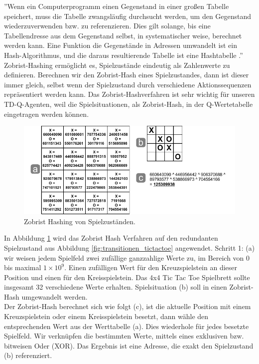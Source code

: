 ''Wenn ein Computerprogramm einen Gegenstand in einer großen Tabelle speichert, muss die Tabelle zwangsläufig durchsucht werden, um den Gegenstand wiederzuverwenden bzw. zu referenzieren. Dies gilt solange, bis eine Tabellendresse aus dem Gegenstand selbst, in systematischer weise, berechnet werden kann. Eine Funktion die Gegenstände in Adressen umwandelt ist ein Hash-Algorithmus, und die daraus resultierende Tabelle ist eine Hashtabelle \cite[3]{Zobrist}.'' \\

Zobrist-Hashing ermöglicht es, Spielzustände eindeutig als Zahlenwerte zu definieren. Berechnen wir den Zobrist-Hash eines Spielzustandes, dann ist dieser immer gleich, selbst wenn der Spielzustand durch verschiedene Aktionssequenzen repräsentiert werden kann. Das Zobrist-Hashverfahren ist sehr wichtig für unseren TD-Q-Agenten, weil die Spielsituationen, als Zobrist-Hash, in der Q-Wertetabelle eingetragen werden können.

\begin{figure}[!htbp]
  \centering
  \includegraphics[scale = 1.3]{inhalt/abbildungen/zobrist_hash_tictactoe.pdf}
  \caption{Zobrist Hashing von Spielzuständen.}
  \label{fig:zobrist_hash_tictactoe}
\end{figure} 


In Abbildung \ref{fig:zobrist_hash_tictactoe} wird das Zobrist Hash Verfahren auf den redundanten Spielzustand aus Abbildung \ref{fig:transitionen_tictactoe} angewendet. Schritt 1: (a) wir weisen jedem Spielfeld zwei zufällige ganzzahlige Werte zu, im Bereich von 0 bis maximal $1 \times 10^{9}$. Einen zufälligen Wert für den Kreuzspielstein an dieser Position und einen für den Kreisspielstein. Das 4x4 Tic Tac Toe Spielbrett sollte insgesamt 32 verschiedene Werte erhalten. Spielsituation (b) soll in einen Zobrist-Hash umgewandelt werden. \\

Der Zobrist-Hash berechnet sich wie folgt (c), ist die aktuelle Position mit einem Kreuzspielstein oder einem Kreisspielstein besetzt, dann wähle den entsprechenden Wert aus der Werttabelle (a). Dies wiederhole für jedes besetzte Spielfeld. Wir verknüpfen die bestimmten Werte, mittels eines exklusiven bzw. bitweisen Oder (XOR). Das Ergebnis ist eine Adresse, die exakt den Spielzustand (b) referenziert. \\


